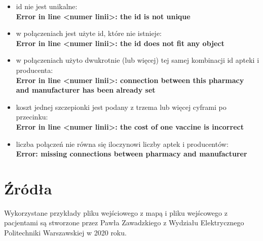 \documentclass[10pt,a4paper]{article}
\begin{document}
\begin{itemize}
\item id nie jest unikalne: \\ \textbf{Error in line \textless numer linii\textgreater : the id is not unique }
\item w połączeniach jest użyte id, które nie istnieje: \\ \textbf{Error in line \textless numer linii\textgreater: the id does not fit any object}
\item w połączeniach użyto dwukrotnie (lub więcej) tej samej kombinacji id apteki i producenta: \\ \textbf{Error in line \textless numer linii\textgreater : connection between this pharmacy and manufacturer has been already set}
\item koszt jednej szczepionki jest podany z trzema lub więcej cyframi po przecinku: \\ \textbf{Error in line \textless numer linii\textgreater: the cost of one vaccine is incorrect}
\item liczba połączeń nie równa się iloczynowi liczby aptek i producentów: \\ \textbf{Error: missing connections between pharmacy and manufacturer}
\end{itemize}

\section{Źródła}
Wykorzystane przykłady pliku wejściowego z mapą i pliku wejścowego z pacjentami są stworzone przez Pawła Zawadzkiego z Wydziału Elektrycznego Politechniki Warszawskiej w 2020 roku.
\end{document}
